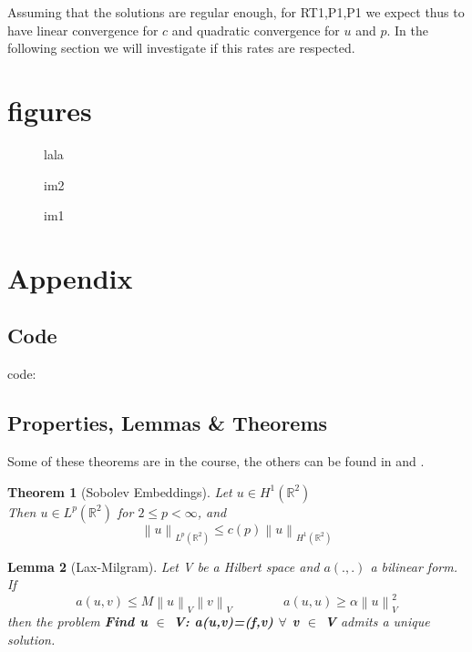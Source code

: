 \documentclass[conference]{IEEEtran}
\newcommand{\norm}[1]{\left\lVert#1\right\rVert}
\newtheorem{theorem}{Theorem}[section]
\newtheorem{lemma}[theorem]{Lemma}
\begin{document}
Assuming that the solutions are regular enough, for RT1,P1,P1 we expect thus to have linear convergence for $c$ and quadratic convergence for $u$ and $p$. In the following section we will investigate if this rates are respected.


\section{figures}

\begin{figure}[!ht]
\centering 
\caption{lala}
\label{fig:fig7}
\end{figure}

\begin{figure}[!ht]
\centering 
\begin{minipage}[t]{4cm} 
\centering 
\caption{im2} 
\label{fig:fig8}
\end{minipage} 
\begin{minipage}[t]{4cm} 
\centering 
\caption{im1}
\label{fig:fig9}
\end{minipage} 
\end{figure}

\section{Appendix}\label{sec:appendix}
\subsection{Code}
code: 
\subsection{Properties, Lemmas \& Theorems}
Some of these theorems are in the course, the others can be found in \cite{Salsa} and \cite{Perotto}. \\
\begin{theorem}[Sobolev Embeddings\cite{Salsa}]
\label{th:sob}
Let $ u \in H^1(\mathbb{R}^2)$ \\
Then $u \in L^p(\mathbb{R}^2)$ for $2 \leq p < \infty$, and
$$\norm{u}_{L^p(\mathbb{R}^2)} \leq c(p) \norm{u}_{H^1(\mathbb{R}^2)} $$
\end{theorem}
\begin{lemma}[Lax-Milgram]
\label{th:laxMilgram}
Let V be a Hilbert space and $a(.,.)$ a bilinear form. If
$$ a(u,v) \leq M \norm{u}_V \norm{v}_V \qquad \qquad a(u,u)\geq \alpha \norm{u}_V^2$$
then the problem \textbf{Find u $\in$ V: a(u,v)=(f,v) $\forall$ v $\in$ V} admits a unique solution.
\end{lemma}
\end{document}
